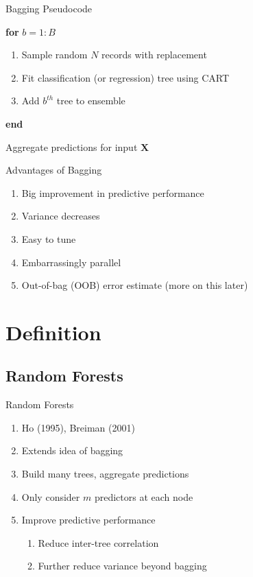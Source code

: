 \documentclass[pdf]{beamer}
\begin{document}
		
		\begin{frame}{Bagging Pseudocode}
			\begin{enumerate}[]
				{\selectfont
				\item{\textbf{for} $b = 1:B$}
					\begin{enumerate}[]
						\item{\hspace{3 mm} Sample random $N$ records with replacement}
						\item{\hspace{3 mm} Fit classification (or regression) tree using CART}
						\item{\hspace{3 mm} Add $b^{th}$ tree to ensemble}
					\end{enumerate}
				\item{\textbf{end}}
				\item Aggregate predictions for input $\textbf{X}$
				}
			\end{enumerate}
		\end{frame}
	
		
		\begin{frame}{Advantages of Bagging}
			\begin{enumerate}
				\item Big improvement in predictive performance
				\item Variance decreases
				\item Easy to tune
				\item Embarrassingly parallel
				\item Out-of-bag (OOB) error estimate (more on this later)
					
			\end{enumerate}
		\end{frame}

		
	
\section{Definition}
	\subsection{Random Forests}
		\begin{frame}{Random Forests}
    			\begin{enumerate}
				\item{Ho (1995), Breiman (2001)}
				\item{Extends idea of bagging}
				\item{Build many trees, aggregate predictions}
				\item{Only consider $m$ predictors at each node}
				\item{Improve predictive performance}
					\begin{enumerate}[1]
						\item Reduce inter-tree correlation
						\item Further reduce variance beyond bagging
					\end{enumerate}
			\end{enumerate}
    		\end{frame}
\end{document}
